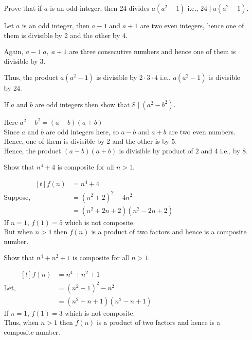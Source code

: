 \documentclass[12pt]{book}
\begin{document}
\begin{qn}
    Prove that if $ a $ is an odd integer, then  24 divides $ a(a^2-1) $ i.e., $ 24\mid a(a^2-1) $.
\end{qn}
\begin{soln}
    Let $ a $ is an odd integer, then $ a-1  $ and $ a+1 $ are two even integers, hence one of them is divisible by 2 and the other by 4.

    Again, $ a-1\;a,\;a+1 $ are three consecutive numbers and hence one of them is divisible by 3.

    Thus, the product $ a(a^2-1) $ is divisible by $ 2\cdot3\cdot4 $ i.e., $ a(a^2-1) $ is divisible by 24.
\end{soln}
\begin{qn}
    If $ a $ and $ b $ are odd integers then show that $ 8\mid (a^2-b^2) $.
\end{qn}
\begin{soln}
    Here $ a^2-b^2=(a-b)(a+b) $\\
    Since $ a $ and $ b $ are odd integers here, so $ a-b $ and $ a+b $ are two even numbers. Hence, one of them is divisible by 2 and the other is by 5.\\
    Hence, the product $ (a-b)(a+b) $ is divisible by product of $ 2 $ and 4 i.e., by 8.
\end{soln}
\begin{qn}
    Show that $ n^4+4 $ is composite for all $ n>1 $.
\end{qn}
\begin{soln}
    Suppose, $ \begin{aligned}[t]
        f(n)&=n^4+4\\
        &=(n^2+2)^2-4n^2\\
        &=(n^2+2n+2)(n^2-2n+2)
    \end{aligned} $\\
    If $ n=1 $, $ f(1)=5 $ which is not composite.\\
    But when $ n>1 $ then $ f(n) $ is a product of two factors and hence is a composite number.
\end{soln}
\begin{qn}
    Show that $ n^4+n^2+1 $ is composite for all $ n>1 $.
\end{qn}
\begin{soln}
    Let, $ \begin{aligned}[t]
        f(n)&=n^4+n^2+1\\
        &=(n^2+1)^2-n^2\\
        &=(n^2+n+1)(n^2-n+1)
    \end{aligned} $\\
    If $ n=1 $, $ f(1)=3 $ which is not composite.\\
    Thus, when $ n>1 $ then $ f(n) $ is a product of two factors and hence is a composite number.
\end{soln}
\end{document}
